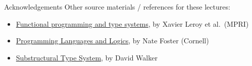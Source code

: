 \documentclass[compress]{beamer}
\begin{document}







\begin{frame}{Acknowledgements}
  Other source materials / references for these lectures:
  \begin{itemize}
  \item \href{https://xavierleroy.org/mpri/2-4/}{Functional
      programming and type systems}, by Xavier Leroy et al.\ (MPRI)
  \item \href{http://www.cs.cornell.edu/courses/cs4110/2014fa}{Programming
      Languages and Logics}, by Nate Foster (Cornell)
  \item \href{https://mitpress.mit.edu/sites/default/files/titles/content/9780262162289_sch_0001.pdf}{Substructural
      Type System}, by David Walker
  \end{itemize}
\end{frame}
\end{document}
